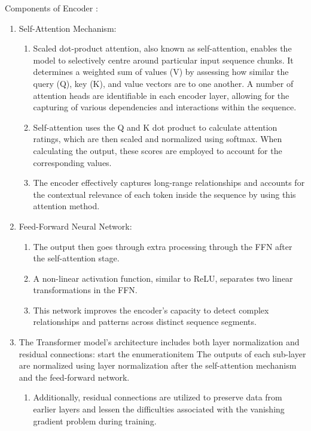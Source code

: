 Components of Encoder : 

\begin{enumerate}
   \item Self-Attention Mechanism:
   \begin{enumerate}
        \item Scaled dot-product attention, also known as self-attention, enables the model to selectively centre around particular input sequence chunks. It determines a weighted sum of values (V) by assessing how similar the query (Q), key (K), and value vectors are to one another.
         A number of attention heads are identifiable in each encoder layer, allowing for the capturing of various dependencies and interactions within the sequence.
        
         \item Self-attention uses the Q and K dot product to calculate attention ratings, which are then scaled and normalized using softmax. When calculating the output, these scores are employed to account for the corresponding values.
         \item The encoder effectively captures long-range relationships and accounts for the contextual relevance of each token inside the sequence by using this attention method.


    \end{enumerate}
    
   \item Feed-Forward Neural Network:
    \begin{enumerate}
        \item The output then goes through extra processing through the FFN after the self-attention stage.

        \item A non-linear activation function, similar to ReLU, separates two linear transformations in the FFN.

        \item This network improves the encoder's capacity to detect complex relationships and patterns across distinct sequence segments.


    \end{enumerate}

   \item The Transformer model's architecture includes both layer normalization and residual connections:
    start the enumerationitem The outputs of each sub-layer are normalized using layer normalization after the self-attention mechanism and the feed-forward network.
\begin{enumerate}
        \item Additionally, residual connections are utilized to preserve data from earlier layers and lessen the difficulties associated with the vanishing gradient problem during training.


\end{enumerate}
\end{enumerate}
